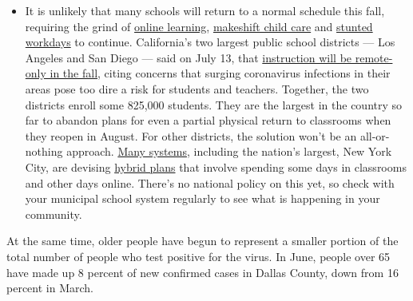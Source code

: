 \begin{itemize}
  \begin{itemize}
  \tightlist
  \item
    It is unlikely that many schools will return to a normal schedule
    this fall, requiring the grind of
    \href{https://www.nytimes3xbfgragh.onion/2020/06/05/us/coronavirus-education-lost-learning.html?action=click\&pgtype=Article\&state=default\&region=MAIN_CONTENT_3\&context=storylines_faq}{online
    learning},
    \href{https://www.nytimes3xbfgragh.onion/2020/05/29/us/coronavirus-child-care-centers.html?action=click\&pgtype=Article\&state=default\&region=MAIN_CONTENT_3\&context=storylines_faq}{makeshift
    child care} and
    \href{https://www.nytimes3xbfgragh.onion/2020/06/03/business/economy/coronavirus-working-women.html?action=click\&pgtype=Article\&state=default\&region=MAIN_CONTENT_3\&context=storylines_faq}{stunted
    workdays} to continue. California's two largest public school
    districts --- Los Angeles and San Diego --- said on July 13, that
    \href{https://www.nytimes3xbfgragh.onion/2020/07/13/us/lausd-san-diego-school-reopening.html?action=click\&pgtype=Article\&state=default\&region=MAIN_CONTENT_3\&context=storylines_faq}{instruction
    will be remote-only in the fall}, citing concerns that surging
    coronavirus infections in their areas pose too dire a risk for
    students and teachers. Together, the two districts enroll some
    825,000 students. They are the largest in the country so far to
    abandon plans for even a partial physical return to classrooms when
    they reopen in August. For other districts, the solution won't be an
    all-or-nothing approach.
    \href{https://bioethics.jhu.edu/research-and-outreach/projects/eschool-initiative/school-policy-tracker/}{Many
    systems}, including the nation's largest, New York City, are
    devising
    \href{https://www.nytimes3xbfgragh.onion/2020/06/26/us/coronavirus-schools-reopen-fall.html?action=click\&pgtype=Article\&state=default\&region=MAIN_CONTENT_3\&context=storylines_faq}{hybrid
    plans} that involve spending some days in classrooms and other days
    online. There's no national policy on this yet, so check with your
    municipal school system regularly to see what is happening in your
    community.
  \end{itemize}
\end{itemize}

At the same time, older people have begun to represent a smaller portion
of the total number of people who test positive for the virus. In June,
people over 65 have made up 8 percent of new confirmed cases in Dallas
County, down from 16 percent in March.

